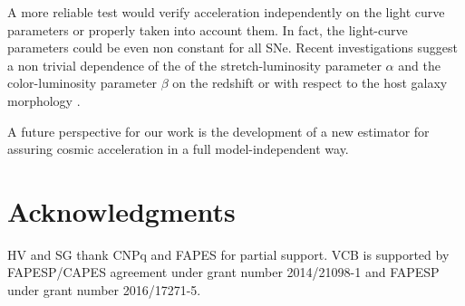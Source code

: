 \documentclass[nofootinbib,twocolumn]{revtex4}
\begin{document}
A more reliable test would verify acceleration independently on the light curve parameters or properly taken into account them. In fact, the light-curve parameters could be even non constant for all SNe. Recent investigations suggest a non trivial dependence of the of the stretch-luminosity parameter $\alpha$ and the color-luminosity parameter $\beta$ on the redshift \cite{Li:2016dqg} or with respect to the host galaxy morphology \cite{Henne:2016mkt}.

A future perspective for our work is the development of a new estimator for assuring cosmic acceleration in a full model-independent way.












\section*{Acknowledgments}

HV and SG thank CNPq and FAPES for partial support. VCB is supported
by FAPESP/CAPES agreement under grant number 2014/21098-1 and FAPESP under grant number 2016/17271-5.
\end{document}
